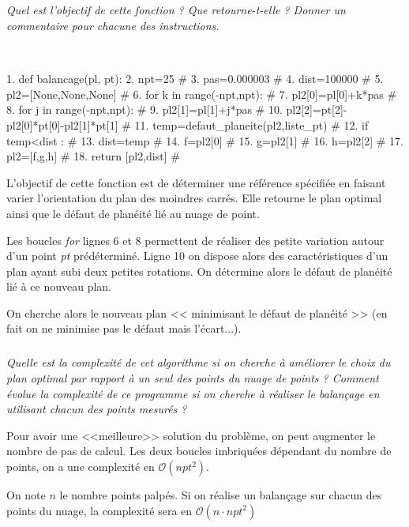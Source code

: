 \documentclass[10pt,fleqn]{article} %
\begin{document}
\subparagraph{}
\textit{Quel est l'objectif de cette fonction ? Que retourne-t-elle ? Donner un commentaire pour chacune des instructions.}
\ifprof
\begin{corrige}
~\\
\begin{minipage}[c]{.57\linewidth}
\begin{python}
 1. def balancage(pl, pt):
 2.    npt=25                            #
 3.    pas=0.000003                      #
 4.    dist=100000                       #
 5.    pl2=[None,None,None]              #
 6.    for k in range(-npt,npt):         #
 7.        pl2[0]=pl[0]+k*pas            #
 8.        for j in range(-npt,npt):     #
 9.            pl2[1]=pl[1]+j*pas        #
10.            pl2[2]=pt[2]-pl2[0]*pt[0]-pl2[1]*pt[1]  #
11.            temp=defaut_planeite(pl2,liste_pt)	   #
12.            if temp<dist :         #
13.                dist=temp          #
14.                f=pl2[0]           #
15.                g=pl2[1]           #
16.                h=pl2[2]           #
17.    pl2=[f,g,h]                    #    
18.    return [pl2,dist]	      #
\end{python}
\end{minipage}\hfill
\begin{minipage}[c]{.43\linewidth}
L'objectif de cette fonction est de déterminer une référence spécifiée en faisant varier l'orientation du plan des moindres carrés. Elle retourne le plan optimal ainsi que le défaut de planéité lié au nuage de point.

Les boucles \textsl{for} lignes 6 et 8 permettent de réaliser des petite variation autour d'un point \textsl{pt} prédéterminé. 
Ligne 10 on dispose alors des caractéristiques d'un plan ayant subi deux petites rotations. 
On détermine alors le défaut de planéité lié à ce nouveau plan. 

On cherche alors le nouveau plan << minimisant le défaut de planéité >> (en fait on ne minimise pas le défaut mais l'écart...).

\end{minipage}
\end{corrige}
\else
\fi

\subparagraph{}
\textit{Quelle est la complexité de cet algorithme si on cherche à améliorer le choix du plan optimal par rapport à un seul des points du nuage de points ? Comment évolue la complexité de ce programme si on cherche à réaliser le balançage en utilisant chacun des points mesurés ?}
\ifprof
\begin{corrige}
Pour avoir une <<meilleure>> solution du problème, on peut augmenter le nombre de pas de calcul. Les deux boucles imbriquées dépendant du nombre de points, on a une complexité en $\mathcal{O}(npt^2)$.

On note $n$ le nombre points palpés. Si on réalise un balançage sur chacun des points du nuage, la complexité sera en $\mathcal{O}(n\cdot npt^2)$
\end{corrige}
\else
\fi
\end{document}
